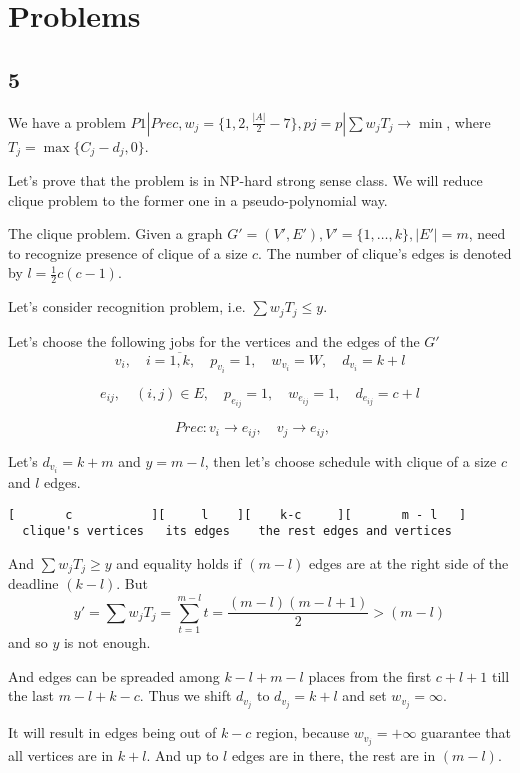 \documentclass{amsart}
\begin{document}
\section{Problems}

\subsection{5}

We have a problem
$P1 | Prec, w_j= \{ 1,2,\frac{|A|}{2}-7 \}, pj=p | \sum w_j T_j \to \min$,
where $T_j = \max \{C_j - d_j, 0\}$.

Let's prove that the problem is in NP-hard strong sense class.
We will reduce clique problem to the former one in a
pseudo-polynomial way.

The clique problem. Given a graph $G'=(V',E'), V'=\{1,\dots,k\}, |E'|=m$,
need to recognize presence of clique of a size $c$.
The number of clique's edges is denoted by
$l = \frac{1}{2}c(c-1)$.

Let's consider recognition problem, i.e. $\sum w_j T_j \leqslant y$.

Let's choose the following jobs for the vertices and the edges of the $G'$
\[
  v_i, \quad i=\overline{1,k}, \quad p_{v_i} = 1, \quad
  w_{v_i} = W, \quad d_{v_i} = k + l
\]

\[
  e_{ij}, \quad (i,j) \in E, \quad p_{e_{ij}} = 1, \quad
  w_{e_{ij}} = 1, \quad d_{e_{ij}} = c + l
\]

\[
  Prec: v_i \to e_{ij}, \quad v_j \to e_{ij}, \quad
\]

Let's $d_{v_i} = k + m$ and $y = m - l$, then let's
choose schedule with clique of a size $c$ and $l$ edges.

\begin{verbatim}
[       c           ][     l    ][    k-c     ][       m - l   ]
  clique's vertices   its edges    the rest edges and vertices
\end{verbatim}

And $\sum w_jT_j \geqslant y$ and equality holds if $(m-l)$
edges are at the right side of the deadline $(k-l)$.
But
\[
  y' = \sum w_jT_j = \sum_{t=1}^{m-l} t = \frac{(m-l)(m-l+1)}{2} > (m-l)
\]
and so $y$ is not enough.

And edges can be spreaded among $k - l + m - l$ places from the first
$c + l + 1$ till the last $m - l + k - c$. Thus we shift
$d_{v_j}$ to $d_{v_j} = k + l$ and set $w_{v_j}=\infty$.

It will result in edges being out of $k - c$ region,
because $w_{v_j}=+\infty$ guarantee that all vertices are in $k+l$.
And up to $l$ edges are in there, the rest are in $(m-l)$.
\end{document}

